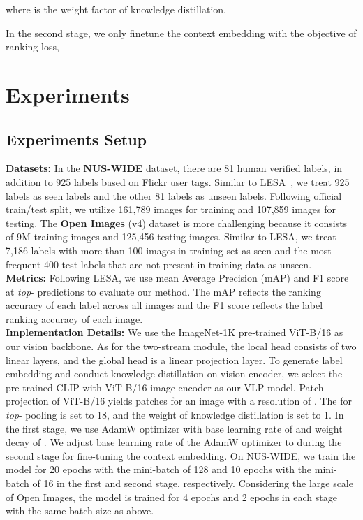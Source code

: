 \documentclass[letterpaper]{article} \usepackage{aaai23}  \usepackage{times}  \usepackage{helvet}  \usepackage{courier}  \usepackage[hyphens]{url}  \usepackage{graphicx} \urlstyle{rm} \def\UrlFont{\rm}  \usepackage{natbib}  \usepackage{caption} \frenchspacing  \setlength{\pdfpagewidth}{8.5in}  \setlength{\pdfpageheight}{11in}
\begin{document}
where  is the weight factor of knowledge distillation. \par
In the second stage, we only finetune the context embedding with the objective of ranking loss,


\section{Experiments}

\subsection{Experiments Setup}
\noindent\textbf{Datasets:} 
In the \textbf{NUS-WIDE} dataset, there are 81 human verified labels, in addition to 925 labels based on Flickr user tags. 
Similar to LESA~\cite{lesa}, we treat 925 labels as seen labels and the other 81 labels as unseen labels.
Following official train/test split, we utilize 161,789 images for training and 107,859 images for testing.
The \textbf{Open Images} (v4) dataset is more challenging because it consists of 9M training images and 125,456 testing images. 
Similar to LESA, we treat 7,186 labels with more than 100 images in training set as seen and the most frequent 400 test labels that are not present in training data as unseen. \\ 
\noindent\textbf{Metrics:} 
Following LESA, we use mean Average Precision (mAP) and F1 score at \textit{top}- predictions to evaluate our method.
The mAP reflects the ranking accuracy of each label across all images and the F1 score reflects the label ranking accuracy of each image. \\ 
\noindent\textbf{Implementation Details:} 
We use the ImageNet-1K pre-trained ViT-B/16 as our vision backbone.
As for the two-stream module, the local head consists of two linear layers, and the global head is a linear projection layer.
To generate label embedding and conduct knowledge distillation on vision encoder, we select the pre-trained CLIP with ViT-B/16 image encoder as our VLP model.
Patch projection of ViT-B/16 yields  patches for an image with a resolution of .
The  for \textit{top}- pooling is set to 18, and the weight of knowledge distillation  is set to 1.
In the first stage, we use AdamW optimizer with base learning rate of  and weight decay of .
We adjust base learning rate of the AdamW optimizer to  during the second stage for fine-tuning the context embedding.
On NUS-WIDE, we train the model for 20 epochs with the mini-batch of 128 and 10 epochs with the mini-batch of 16 in the first and second stage, respectively.
Considering the large scale of Open Images, the model is trained for 4 epochs and 2 epochs in each stage with the same batch size as above.
\end{document}
